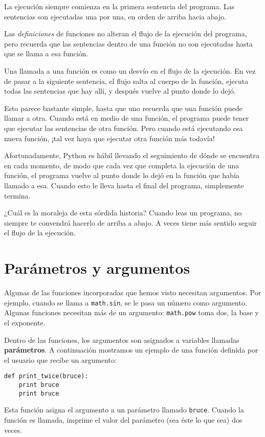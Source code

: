 La ejecución siempre comienza en la primera sentencia del programa.
Las sentencias son ejecutadas una por una, en orden de arriba hacia abajo.

Las \emph{definiciones} de funciones no alteran el flujo de la ejecución del
programa, pero recuerda que las sentencias dentro de una función no son
ejecutadas hasta que se llama a esa función.

Una llamada a una función es como un desvío en el flujo de la ejecución. En vez
de pasar a la siguiente sentencia, el flujo salta al cuerpo de
la función, ejecuta todas las sentencias que hay allí, y después vuelve
al punto donde lo dejó.

Esto parece bastante simple, hasta que uno recuerda que una función puede
llamar a otra. Cuando está en medio de una función, el programa puede
tener que ejecutar las sentencias de otra función. Pero cuando
está ejecutando esa nueva función, ¡tal vez haya que ejecutar
otra función más todavía!

Afortunadamente, Python es hábil llevando el seguimiento de dónde se encuentra en cada momento, de modo
que cada vez que completa la ejecución de una función, el programa vuelve al punto donde lo dejó
en la función que había llamado a esa. Cuando esto le lleva hasta el final del programa,
simplemente termina.

¿Cuál es la moraleja de esta sórdida historia? Cuando leas un programa, no
siempre te convendrá hacerlo de arriba a abajo. A veces tiene más
sentido seguir el flujo de la ejecución.

\section{Parámetros y argumentos}
\label{parameters}

Algunas de las funciones incorporadas que hemos visto necesitan argumentos. Por
ejemplo, cuando se llama a {\tt math.sin}, se le pasa un número
como argumento. Algunas funciones necesitan más de un argumento:
{\tt math.pow} toma dos, la base y el exponente.

Dentro de las funciones, los argumentos son asignados a
variables llamadas {\bf parámetros}. A continuación mostramos un ejemplo
de una función definida por el usuario que recibe un argumento:


\beforeverb
\begin{verbatim}
def print_twice(bruce):
    print bruce
    print bruce
\end{verbatim}
\afterverb
%
Esta función asigna el argumento a un parámetro
llamado {\tt bruce}. Cuando la función es llamada, imprime el valor del
parámetro (sea éste lo que sea) dos veces.

